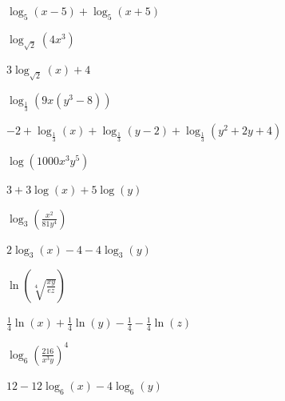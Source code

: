 \documentclass{ximera}
\begin{document}
\begin{question}
\begin{problem}
    \begin{solution}
        $\log_{5}(x-5) + \log_{5}(x+5)$
    \end{solution}
\end{problem}

\begin{problem}
    $\log_{\sqrt{2}} \left(4x^3\right)$

\begin{solution}
$3\log_{\sqrt{2}}(x) + 4$
\end{solution}
\end{problem}

\begin{problem}
    $\log_{\frac{1}{3}}(9x(y^{3} - 8))$

    \begin{solution}
      $-2 + \log_{\frac{1}{3}}(x) + \log_{\frac{1}{3}}(y - 2) + \log_{\frac{1}{3}}(y^{2} + 2y + 4)$
    \end{solution}
\end{problem}

\begin{problem}
    $\log\left(1000x^3y^5\right)$

\begin{solution}
$3 + 3\log(x) + 5 \log(y)$
\end{solution}
\end{problem}

\begin{problem}
    $\log_{3} \left(\frac{x^2}{81y^4}\right)$

    \begin{solution}
         $2\log_{3}(x) - 4 - 4\log_{3}(y)$
    \end{solution}
\end{problem}

\begin{problem}
    $\ln\left(\sqrt[4]{\frac{xy}{ez}}\right)$

\begin{solution}
$\frac{1}{4} \ln(x) + \frac{1}{4} \ln(y) - \frac{1}{4} - \frac{1}{4} \ln(z)$
\end{solution}
\end{problem}

\begin{problem}
    $\log_{6} \left(\frac{216}{x^3y}\right)^4$

    \begin{solution}
        $12-12\log_{6}(x) - 4\log_{6}(y)$
    \end{solution}
\end{problem}


\end{question}
\end{document}

